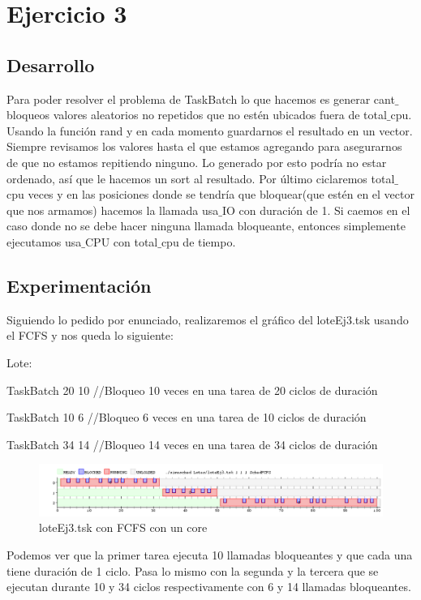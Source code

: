 
\section{Ejercicio 3}

\subsection{Desarrollo}

Para poder resolver el problema de TaskBatch lo que hacemos es generar cant$\_$bloqueos valores aleatorios no repetidos que no estén ubicados fuera de total$\_$cpu. Usando la
función rand y en cada momento guardarnos el resultado en un vector. Siempre revisamos los valores hasta el que estamos agregando para asegurarnos de que no estamos repitiendo
ninguno. Lo generado por esto podría no estar ordenado, así que le hacemos un sort al resultado. Por último ciclaremos total$\_$cpu veces y en las posiciones donde se tendría que 
bloquear(que estén en el vector que nos armamos) hacemos la llamada usa$\_$IO con duración de 1. Si caemos en el caso donde no se debe hacer ninguna llamada bloqueante, 
entonces simplemente ejecutamos usa$\_$CPU con total$\_$cpu de tiempo.

\subsection{Experimentación}

Siguiendo lo pedido por enunciado, realizaremos el gráfico del loteEj3.tsk usando el FCFS y nos queda lo siguiente:

Lote:

TaskBatch 20 10  //Bloqueo 10 veces en una tarea de 20 ciclos de duración

TaskBatch 10 6 	//Bloqueo 6 veces en una tarea de 10 ciclos de duración

TaskBatch 34 14 //Bloqueo 14 veces en una tarea de 34 ciclos de duración

\begin{figure}[H]
  \centering
    \includegraphics[width=1.1\textwidth]{imagenes/Ej3Experimento1.png}
  \caption{loteEj3.tsk con FCFS con un core}
\end{figure}

Podemos ver que la primer tarea ejecuta 10 llamadas bloqueantes y que cada una tiene duración de 1 ciclo. Pasa lo mismo con la segunda y la tercera que se ejecutan durante 10
 y 34 ciclos respectivamente con 6 y 14 llamadas bloqueantes.

